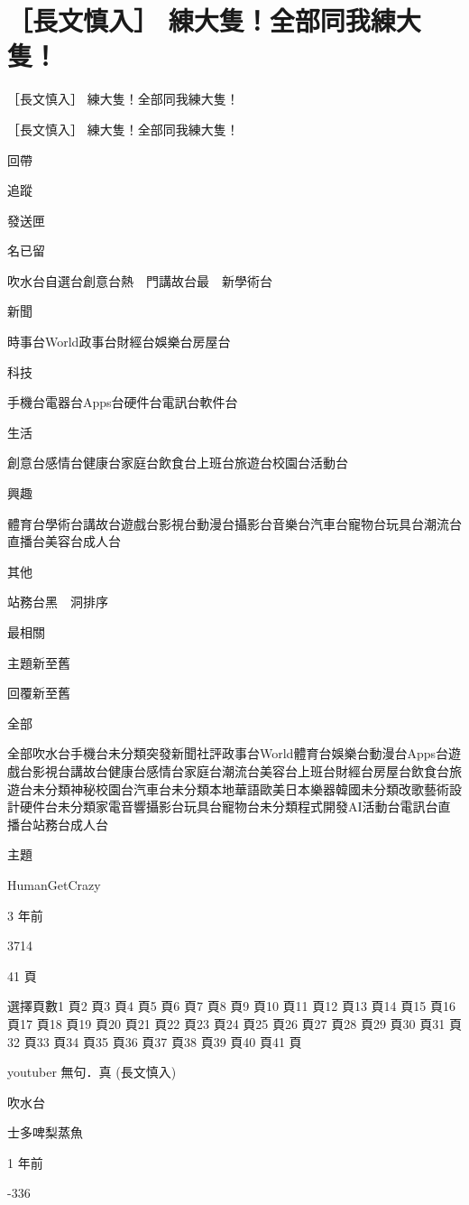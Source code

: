 \chapter{［長文慎入］ 練大隻！全部同我練大隻！}

［長文慎入］ 練大隻！全部同我練大隻！

［長文慎入］ 練大隻！全部同我練大隻！

回帶

追蹤

發送匣

名已留

吹水台自選台創意台熱　門講故台最　新學術台

新聞

時事台World政事台財經台娛樂台房屋台

科技

手機台電器台Apps台硬件台電訊台軟件台

生活

創意台感情台健康台家庭台飲食台上班台旅遊台校園台活動台

興趣

體育台學術台講故台遊戲台影視台動漫台攝影台音樂台汽車台寵物台玩具台潮流台直播台美容台成人台

其他

站務台黑　洞排序

最相關

主題新至舊

回覆新至舊

全部

全部吹水台手機台未分類突發新聞社評政事台World體育台娛樂台動漫台Apps台遊戲台影視台講故台健康台感情台家庭台潮流台美容台上班台財經台房屋台飲食台旅遊台未分類神秘校園台汽車台未分類本地華語歐美日本樂器韓國未分類改歌藝術設計硬件台未分類家電音響攝影台玩具台寵物台未分類程式開發AI活動台電訊台直播台站務台成人台

主題

HumanGetCrazy

3 年前

3714

41 頁

選擇頁數1 頁2 頁3 頁4 頁5 頁6 頁7 頁8 頁9 頁10 頁11 頁12 頁13 頁14 頁15 頁16 頁17 頁18 頁19 頁20 頁21 頁22 頁23 頁24 頁25 頁26 頁27 頁28 頁29 頁30 頁31 頁32 頁33 頁34 頁35 頁36 頁37 頁38 頁39 頁40 頁41 頁

youtuber 無句．真 (長文慎入)

吹水台

士多啤梨蒸魚

1 年前

-336

